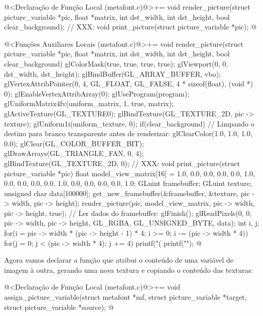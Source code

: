 {\iniciocodigo
@<Declaração de Função Local (metafont.c)@>+=
void render_picture(struct picture_variable *pic, float *matrix, int dst_width,
                    int dst_height, bool clear_background);
// XXX:
void print_picture(struct picture_variable *pic);
@
\fimcodigo

\iniciocodigo
@<Funções Auxiliares Locais (metafont.c)@>+=
void render_picture(struct picture_variable *pic, float *matrix, int dst_width,
                    int dst_height, bool clear_background){
  glColorMask(true, true, true, true);
  glViewport(0, 0, dst_width, dst_height);
  glBindBuffer(GL_ARRAY_BUFFER, vbo);
  glVertexAttribPointer(0, 4, GL_FLOAT, GL_FALSE, 4 * sizeof(float), (void *) 0);
  glEnableVertexAttribArray(0);
  glUseProgram(program);
  glUniformMatrix4fv(uniform_matrix, 1, true, matrix);
  glActiveTexture(GL_TEXTURE0);
  glBindTexture(GL_TEXTURE_2D, pic -> texture);
  glUniform1i(uniform_texture, 0);
  if(clear_background){
    // Limpando o destino para branco transparente antes de renderizar:
    glClearColor(1.0, 1.0, 1.0, 0.0);
    glClear(GL_COLOR_BUFFER_BIT);
  }
  glDrawArrays(GL_TRIANGLE_FAN, 0, 4);
  glBindTexture(GL_TEXTURE_2D, 0);
}
// XXX:
void print_picture(struct picture_variable *pic){
  float model_view_matrix[16] = {1.0, 0.0, 0.0, 0.0,
                               0.0, 1.0, 0.0, 0.0,
                               0.0, 0.0, 1.0, 0.0,
                               0.0, 0.0, 0.0, 1.0};
  GLuint framebuffer;
  GLuint texture;
  unsigned char data[100000];
  get_new_framebuffer(&framebuffer, &texture, pic -> width, pic -> height);
  render_picture(pic, model_view_matrix, pic -> width, pic -> height, true);
  // Ler dados do framebuffer:
  glFinish();
  glReadPixels(0, 0, pic -> width, pic -> height, GL_RGBA, GL_UNSIGNED_BYTE, data);
  {
    int i, j;
    for(i = pic -> width * (pic -> height - 1) * 4;
        i >= 0; i -= (pic -> width * 4)){
      for(j = 0; j < (pic -> width * 4); j += 4)
        printf("(%
        printf("\n");
    }
  }
}
@
\fimcodigo

Agora vamos declarar a função que atribui o conteúdo de uma variável
de imagem à outra, gerando uma nova textura e copiando o conteúdo das
texturas:

\iniciocodigo
@<Declaração de Função Local (metafont.c)@>+=
void assign_picture_variable(struct metafont *mf,
                             struct picture_variable *target,
                             struct picture_variable *source);
@
\fimcodigo

}
